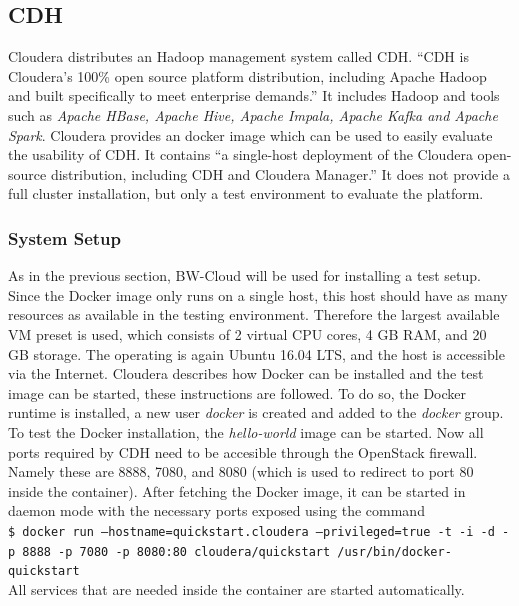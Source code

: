 \subsection{\acl{CDH}}

Cloudera distributes an Hadoop management system called \ac{CDH}.
\enquote{CDH is Cloudera’s 100\% open source platform distribution, including Apache Hadoop and built specifically to meet enterprise demands.}\autocite[][]{cloudera2018cdh}
It includes Hadoop and tools such as \emph{Apache HBase, Apache Hive, Apache Impala, Apache Kafka and Apache Spark}.
Cloudera provides an docker image which can be used to easily evaluate the usability of \ac{CDH}.
It contains \enquote{a single-host deployment of the Cloudera open-source distribution, including CDH and Cloudera Manager.} \autocite[][]{cloudera2018docker}
It does not provide a full cluster installation, but only a test environment to evaluate the platform.

\subsubsection{System Setup}

As in the previous section, BW-Cloud will be used for installing a test setup.
Since the Docker image only runs on a single host, this host should have as many resources as available in the testing environment.
Therefore the largest available \ac{VM} preset is used, which consists of 2 virtual \ac{CPU} cores, 
4 \ac{GB} \ac{RAM}, and 20 \ac{GB} storage. The operating is again Ubuntu 16.04 \ac{LTS}, 
and the host is accessible via the Internet. 
Cloudera describes how Docker can be installed and the test image can be started, 
these instructions are followed. \autocite[][]{cloudera2018docker}
To do so, the Docker runtime is installed, a new  user \emph{docker} is created and added to the \emph{docker} group. To test the Docker installation, the \emph{hello-world} image can be started.
Now all ports required by \ac{CDH} need to be accesible through the OpenStack firewall.
Namely these are 8888, 7080, and 8080 (which is used to redirect to port 80 inside the container).
After fetching the Docker  image, it can be started in daemon mode with the necessary ports exposed using the command\\
\texttt{\$ docker run --hostname=quickstart.cloudera --privileged=true -t -i -d -p 8888 -p 7080 -p 8080:80 cloudera/quickstart /usr/bin/docker-quickstart}\\
All services that are needed inside the container are started automatically.


